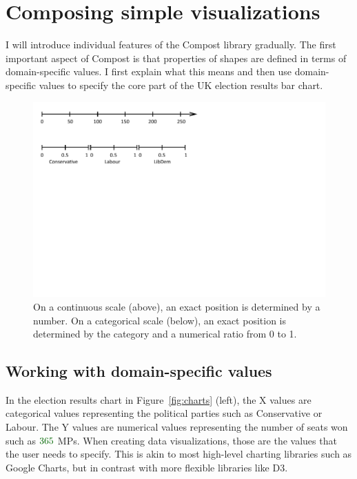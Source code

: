 \documentclass{jfp}
\newcommand{\num}[1]{\textcolor{numclr}{#1}}
\newcommand{\strf}[1]{\textnormal{\textcolor{strclr}{\sffamily #1}}}
\begin{document}
\section{Composing simple visualizations}
I will introduce individual features of the Compost library gradually. The first important aspect of
Compost is that properties of shapes are defined in terms of domain-specific values. I first
explain what this means and then use domain-specific values to specify the core part of the
UK election results bar chart.

\begin{figure}[t]
\includegraphics[scale=1,trim={0cm 6.5cm 6cm 0cm},clip]{figures/values.pdf}
\caption{On a continuous scale (above), an exact position is determined by a number.
  On a categorical scale (below), an exact position is determined by the category and a
  numerical ratio from 0 to 1.}
\label{fig:scales}
\end{figure}

\subsection{Working with domain-specific values}

In the election results chart in Figure~\ref{fig:charts} (left), the X values are categorical
values representing the political parties such as \strf{Conservative} or \strf{Labour}. The
Y values are numerical values representing the number of seats won such as $\num{365}$ MPs.
When creating data visualizations, those are the values that the user needs to specify. This is
akin to most high-level charting libraries such as Google Charts, but in contrast with more
flexible libraries like D3.
\end{document}
